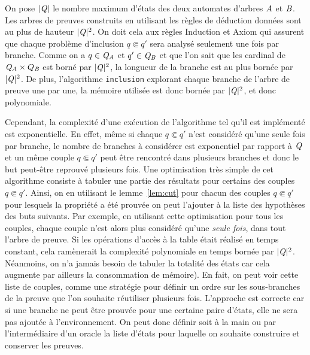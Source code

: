On pose $|\mathit Q|$ le nombre maximum d'états des deux automates d'arbres $\mathit A$ et $\mathit B$.  Les arbres de preuves
construits en utilisant les règles de déduction données sont au plus de hauteur $|\mathit Q|^2$.
On doit cela aux règles Induction et Axiom qui assurent que chaque problème d'inclusion $q \Subset q'$
sera analysé seulement une fois par branche. 
Comme on a $q\in \mathit Q_\mathit A$ et $q' \in \mathit Q_\mathit B$ et que l'on sait que les cardinal de $\mathit Q_\mathit A \times Q_\mathit B$ est borné par $|\mathit Q|^2$,
la longueur de la branche est au plus bornée par $|\mathit Q|^2$.  De plus, l'algorithme \lstinline!inclusion! explorant chaque branche 
de l'arbre de preuve une par une, la mémoire utilisée est donc bornée par $|\mathit Q|^2$,
et donc polynomiale.

Cependant, la complexité d'une exécution de l'algorithme tel qu'il est implémenté est exponentielle.
En effet, même si chaque $q \Subset q'$ n'est considéré qu'une seule fois par branche,
le nombre de branches à considérer est exponentiel par rapport à 
$\mathit Q$ et un même couple $q \Subset q'$ peut être rencontré dans plusieurs branches
et donc le but peut-être reprouvé plusieurs fois.
Une optimisation très simple de cet algorithme consiste à tabuler une partie des résultats
pour certains des couples $q \Subset q'$. Ainsi, on en utilisant le lemme~\ref{lem:cut}
pour chacun des couples $q \Subset q'$ pour lesquels la propriété a été prouvée on peut l'ajouter
à la liste des hypothèses des buts suivants. 
Par exemple, en utilisant cette optimisation pour tous les couples,
chaque couple n'est alors plus considéré qu'une {\em seule fois}, dans tout l'arbre de preuve.
Si les opérations d'accès à la table était réalisé en temps constant, 
cela ramènerait la complexité polynomiale en temps bornée par $|\mathit Q|^2$. 
Néanmoins, on n'a jamais besoin de tabuler la totalité des états car cela augmente par ailleurs
la consommation de mémoire). En fait, on peut voir cette liste de couples, comme une stratégie
pour définir un ordre sur les sous-branches de la preuve que l'on souhaite réutiliser plusieurs fois.
L'approche est correcte car si une branche ne peut être prouvée pour une certaine paire d'états, 
elle ne sera pas ajoutée à l'environnement. On peut donc définir soit à la main ou par l'intermédiaire
d'un oracle la liste d'états pour laquelle on souhaite construire et conserver les preuves.



